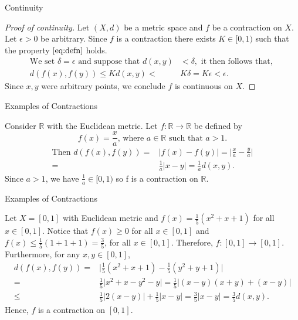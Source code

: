 \documentclass{beamer}
\begin{document}
\begin{frame}{Continuity}
\begin{proof}[Proof of continuity]
Let $(X,d)$ be a metric space and $f$ be a contraction on $X$. Let $\epsilon>0$ be arbitrary. Since $f$ is a contraction there exists $K\in[0,1)$ such that the property $\eqref{eq:defn}$ holds. 
\begin{align*}
\text{We set }  \delta = \epsilon \text{ and suppose that } d(x,y)& < \delta,   \text{ it then follows that, } \\ 
d(f(x),f(y))\leq Kd(x,y) <& K\delta = K\epsilon < \epsilon.
\end{align*}
Since $x,y$ were arbitrary points, we conclude $f$ is continuous on $X$.
\end{proof}

\end{frame} 

\begin{frame}{Examples of Contractions}
\begin{example}
     Consider $\mathbb{R}$ with the Euclidean metric. Let $f:\mathbb{R}\to\mathbb{R}$ be defined by $$f(x)=\frac{x}{a} \text{, where } a\in\mathbb{R} \text{ such that } a>1.$$
    \begin{align*}
        \text{Then } d(f(x),f(y))=&\vert f(x)-f(y)\vert = \big\vert\frac{x}{a}-\frac{y}{a}\big\vert \\ =& \frac{1}{a}\vert x-y\vert = \frac{1}{a}d(x,y).
    \end{align*}
    Since $a>1$, we have $\frac{1}{a}\in[0,1)$ so f is a contraction on $\mathbb{R}$.
\end{example}



\end{frame}

\begin{frame}{Examples of Contractions}
\begin{example}
Let $X=[0,1]$ with Euclidean metric and $f(x)=\frac{1}{5}(x^{2}+x+1)$ for all $x\in[0,1]$. Notice that $f(x)\geq 0$ for all $x\in[0,1]$ and $f(x)\leq \frac{1}{5}(1+1+1) =\frac{3}{5}$, for all $x\in[0,1]$. Therefore, $f:[0,1]\to[0,1]$. Furthermore, for any $x,y\in[0,1]$,
\begin{align*}
    d(f(x),f(y)) =& \big\vert\frac{1}{5}(x^{2}+x+1)-\frac{1}{5}(y^{2}+y+1)\big\vert \\
    =& \frac{1}{5}\vert x^{2}+x-y^{2}-y \vert = \frac{1}{5}\vert (x-y)(x+y) + (x-y)\vert \\
    \leq& \frac{1}{5}\vert 2(x-y)\vert + \frac{1}{5}\vert x-y\vert = \frac{3}{5}\vert x-y \vert = \frac{3}{5}d(x,y).
\end{align*}
Hence, $f$ is a contraction on $[0,1]$.
\end{example}
\end{frame}
\end{document}
